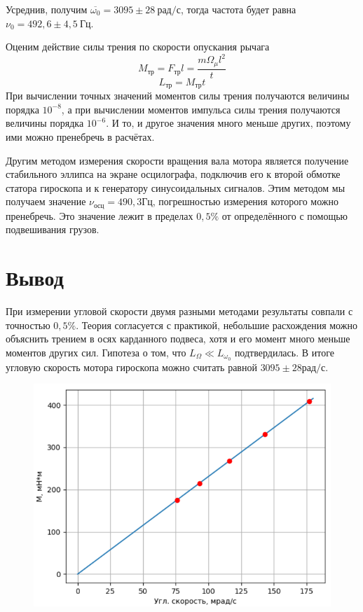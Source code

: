 \documentclass[a4paper, 12pt]{article}
\begin{document}
		Усреднив, получим $\overline{\omega_0} = 3095 \pm 28\: рад/с$, тогда частота будет равна $\nu_0 = 492,6 \pm 4,5\: Гц$.
		\par
		Оценим действие силы трения по скорости опускания рычага
		$$M_{тр}=F_{тр} l= \frac{m \Omega_{\mu} l^2}{t}$$
		$$L_{тр} = M_{тр} t$$
		При вычислении точных значений моментов силы трения получаются величины порядка $10^{-8}$, а при вычислении моментов импульса силы трения получаются величины порядка $10^{-6}$. И то, и другое значения много меньше других, поэтому ими можно пренебречь в расчётах.
		\par
		Другим методом измерения скорости вращения вала мотора является получение стабильного эллипса на экране осцилографа, подключив его к второй обмотке статора гироскопа и к генератору синусоидальных сигналов. Этим методом мы получаем значение $\nu_{осц} = 490,3 Гц$, погрешностью измерения которого можно пренебречь. 
		Это значение лежит в пределах $0,5\%$ от определённого с помощью подвешивания грузов.
	\section*{Вывод}
		При измерении угловой скорости двумя разными методами результаты совпали с точностью $0,5\%$. Теория согласуется с практикой, небольшие расхождения можно объяснить трением в осях карданного подвеса, хотя и его момент много меньше моментов других сил. Гипотеза о том, что $L_{\Omega} \ll L_{\omega_0}$ подтвердилась. В итоге угловую скорость мотора гироскопа можно считать равной $3095 \pm 28 рад/с$.
	\begin{figure}[h!]
		\includegraphics[width=\linewidth]{pict1}
	\end{figure}
\end{document}
